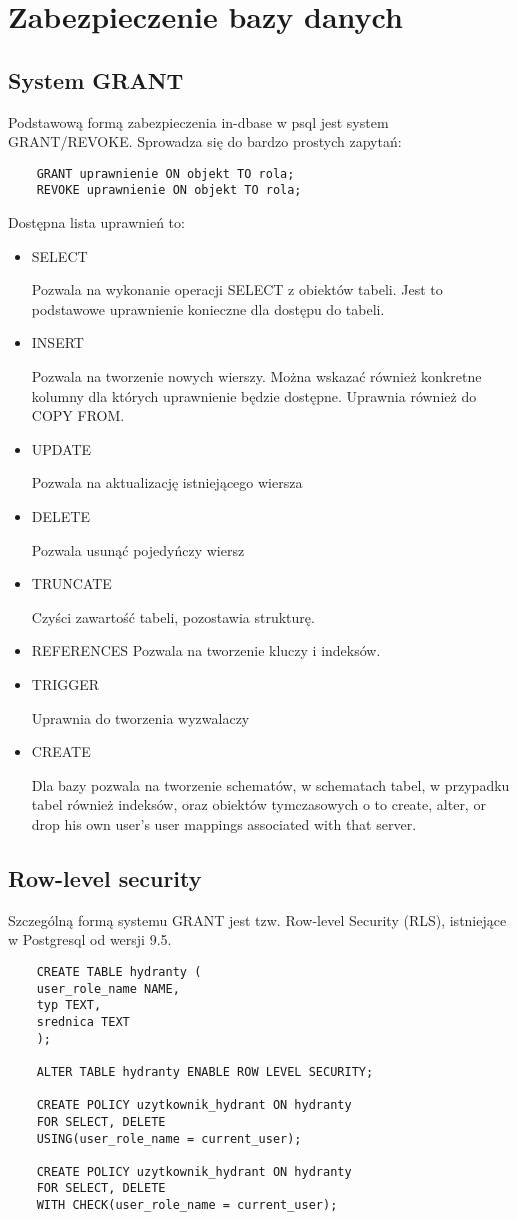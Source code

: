 \chapter{Zabezpieczenie bazy danych}
	\section{System GRANT}
	Podstawową formą zabezpieczenia in-dbase w psql jest system GRANT/REVOKE. Sprowadza się do bardzo prostych zapytań:
	\begin{lstlisting}
	GRANT uprawnienie ON objekt TO rola;
	REVOKE uprawnienie ON objekt TO rola;
	\end{lstlisting}
Dostępna lista uprawnień to:
\begin{itemize}
	\item SELECT
	
Pozwala na wykonanie operacji SELECT z obiektów tabeli. Jest to podstawowe uprawnienie konieczne dla dostępu do tabeli.
	\item INSERT
	
Pozwala na tworzenie nowych wierszy. Można wskazać również konkretne kolumny dla których uprawnienie będzie dostępne. Uprawnia również do COPY FROM.
	\item UPDATE
	
Pozwala na aktualizację istniejącego wiersza
	
	\item DELETE
	
Pozwala usunąć pojedyńczy wiersz
	\item TRUNCATE
	
Czyści zawartość tabeli, pozostawia strukturę.
	\item REFERENCES
Pozwala na tworzenie kluczy i indeksów.

	\item TRIGGER
	
Uprawnia do tworzenia wyzwalaczy
	\item CREATE
	
Dla bazy pozwala na tworzenie schematów, w schematach tabel, w przypadku tabel również indeksów, oraz obiektów tymczasowych
o to create, alter, or drop his own user's user mappings associated with that server.
	
\end{itemize}	
	\section{Row-level security}
	Szczególną formą systemu GRANT jest tzw. Row-level Security (RLS), istniejące w Postgresql od wersji 9.5.
	\begin{lstlisting}
	CREATE TABLE hydranty (  
	user_role_name NAME,
	typ TEXT,
	srednica TEXT
	);
	
	ALTER TABLE hydranty ENABLE ROW LEVEL SECURITY;
	
	CREATE POLICY uzytkownik_hydrant ON hydranty  
	FOR SELECT, DELETE
	USING(user_role_name = current_user);
	
	CREATE POLICY uzytkownik_hydrant ON hydranty  
	FOR SELECT, DELETE
	WITH CHECK(user_role_name = current_user);
	\end{lstlisting}
	
